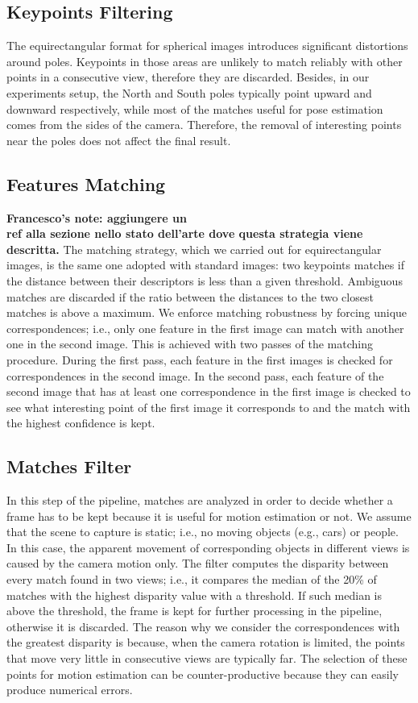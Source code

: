 \subsection{Keypoints Filtering}
The equirectangular format for spherical images introduces significant 
distortions around poles. Keypoints in those areas 
are unlikely to match reliably with other points in a consecutive view, therefore they are discarded.
Besides, in our experiments setup, the North and South poles typically point 
upward and downward respectively, while most of the matches useful for pose 
estimation comes from the sides of the camera. Therefore, the removal of interesting 
points near the poles does not affect the final result.

\subsection{Features Matching}\label{subsec:feature_matching}
\textbf{Francesco's note: aggiungere un \\ref alla sezione nello stato dell'arte dove questa strategia
viene descritta.}
The matching strategy, which we carried out for equirectangular images, is the same one 
adopted with standard images: two keypoints matches if the distance between 
their descriptors is less than a given threshold. Ambiguous matches 
are discarded if the ratio between the distances to the two closest matches is 
above a maximum.
We enforce matching robustness by forcing unique correspondences; i.e.,
only one feature in the first image can match with another one in the second
image. This is achieved with two passes of the matching procedure. During the 
first pass, each feature in the first images is checked for correspondences in
the second image. In the second pass, each feature of the second image that 
has at least one correspondence in the first image is checked to see what 
interesting point of the first image it corresponds to and the match with the
highest confidence is kept.

\subsection{Matches Filter}
In this step of the pipeline, matches are analyzed in order to decide 
whether a frame has to be kept because it is useful for motion estimation or
not.
%
We assume that the scene to capture is static; i.e., no moving objects (e.g., cars) or people. In this case, the apparent movement of corresponding objects in different views is caused by the camera motion only.
%
The filter computes the disparity between every match found in two views; i.e., 
it compares the median of the 20\% of matches with the highest 
disparity value with a threshold. If such median is above 
the threshold, the frame is kept for further processing in the pipeline, 
otherwise it is discarded.
%
The reason why we consider the correspondences with the greatest disparity is 
because, when the camera rotation is limited, the points that move very little 
in consecutive views are typically far. The selection of these points for motion 
estimation can be counter-productive because they can easily produce numerical 
errors. 

